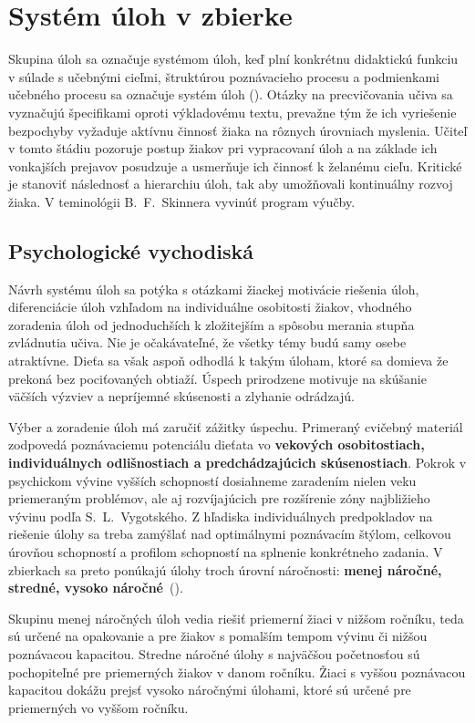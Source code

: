 \section{Systém úloh v zbierke}
Skupina úloh sa označuje systémom úloh, keď plní konkrétnu didaktickú funkciu v súlade s učebnými cieľmi, štruktúrou poznávacieho procesu a podmienkami učebného procesu sa označuje systém úloh (\cite{mindakova_tvorba_2008}). Otázky na precvičovania učiva sa vyznačujú špecifikami oproti výkladovému textu, prevažne tým že ich vyriešenie bezpochyby vyžaduje aktívnu činnosť žiaka na rôznych úrovniach myslenia. Učiteľ v tomto štádiu pozoruje postup žiakov pri vypracovaní úloh a na základe ich vonkajších prejavov posudzuje a usmerňuje ich činnosť k želanému cieľu. Kritické je stanoviť následnosť a hierarchiu úloh, tak aby umožňovali kontinuálny rozvoj žiaka. V teminológii B.~F.~Skinnera vyvinúť program výučby.   

\subsection{Psychologické vychodiská}
Návrh systému úloh sa potýka s otázkami žiackej motivácie riešenia úloh, diferenciácie úloh vzhľadom na individuálne osobitosti žiakov, vhodného zoradenia úloh od jednoduchších k zložitejším a spôsobu merania stupňa zvládnutia učiva. Nie je očakávateľné, že všetky témy budú samy osebe atraktívne. Dieťa sa však aspoň odhodlá k takým úloham, ktoré sa domieva že prekoná bez pociťovaných obtiaží. Úspech prirodzene motivuje na skúšanie väčších výzviev a nepríjemné skúsenosti a zlyhanie odrádzajú. 

Výber a zoradenie úloh má zaručiť zážitky úspechu. Primeraný cvičebný materiál zodpovedá poznávaciemu potenciálu dieťata vo \textbf{vekových osobitostiach, individuálnych odlišnostiach a predchádzajúcich skúsenostiach}. Pokrok v psychickom vývine vyšších schopností dosiahneme zaradením nielen veku priemeraným problémov, ale aj rozvíjajúcich pre rozšírenie zóny najbližieho vývinu podľa S.~L.~Vygotského. Z hľadiska individuálnych predpokladov na riešenie úlohy sa treba zamýšlať nad optimálnymi poznávacím štýlom, celkovou úrovňou schopností a profilom schopností na splnenie konkrétneho zadania. V zbierkach sa preto ponúkajú úlohy troch úrovní náročnosti: \textbf{menej náročné, stredné, vysoko náročné}~(\cite{pavlovkin_ziak_1989}). 

Skupinu menej náročných úloh vedia riešiť priemerní žiaci v nižšom ročníku, teda sú určené na opakovanie a pre žiakov s pomalším tempom vývinu či nižšou poznávacou kapacitou. Stredne náročné úlohy s najväčšou početnosťou sú pochopiteľné pre priemerných žiakov v danom ročníku. Žiaci s vyššou poznávacou kapacitou dokážu prejsť vysoko náročnými úlohami, ktoré sú určené pre priemerných vo vyššom ročníku. 

